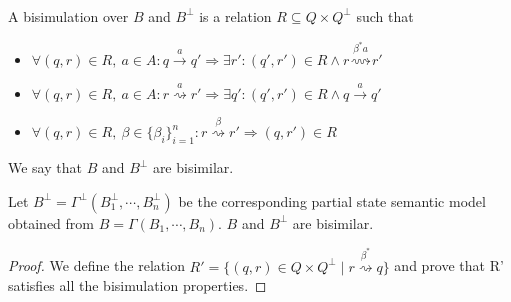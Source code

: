 \documentclass{beamer}
\begin{document}

\begin{frame}
\frametitle{}
 \framesubtitle{}
\scriptsize
\begin{definition}[Bisimulation]
A bisimulation over $B$ and $B^\perp$ is a relation $R\subseteq Q\times Q^\perp$ such that 

\begin{itemize}
\scriptsize
\item $\forall(q,r)\in R,\ a\in A : q\stackrel{a}{\rightarrow}q' \Longrightarrow \exists r' : (q',r')\in R \wedge r\stackrel{\beta^*a}{\rightsquigarrow}r'$

\item $\forall(q,r)\in R,\ a\in A : r\stackrel{a}{\rightsquigarrow}r' \Longrightarrow \exists q' : (q',r')\in R \wedge q\stackrel{a}{\rightarrow}q'$

\item $\forall(q,r)\in R,\ \beta\in\{{\beta}_i\}_{i=1}^n: r\stackrel{\beta}{\rightsquigarrow}r' \Longrightarrow  (q,r')\in R $
\end{itemize}
We say that $B$ and $B^\perp$ are bisimilar.
\end{definition}

\begin{theorem}%
\scriptsize
Let $B^\perp=\Gamma^\perp(B^\perp_1, \cdots ,B^\perp_n)$ be the corresponding partial state semantic model obtained from $B=\Gamma(B_1, \cdots ,B_n)$. $B$ and $B^\perp$ are bisimilar.
\end{theorem}

\begin{proof}%
\tiny 

We define the relation $R'=\{(q,r)\in Q\times Q^\perp\mid r\stackrel{\beta^*}{\rightsquigarrow}q\}$ and prove that R' satisfies all the bisimulation properties.

\end{proof}


\end{frame}

\end{document}
